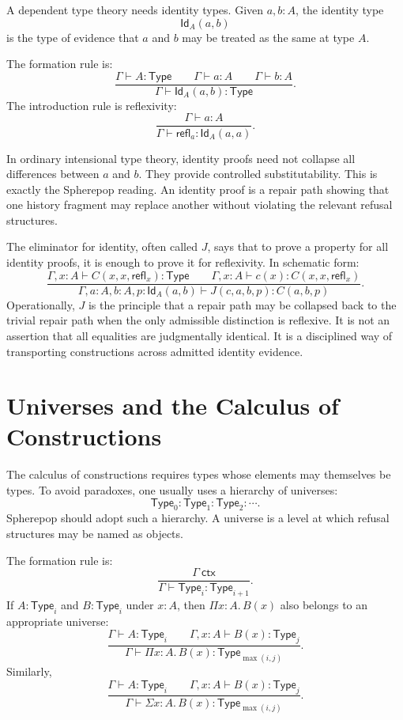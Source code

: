\documentclass[12pt,oneside]{article}
\newcommand{\Type}{\mathsf{Type}}
\newcommand{\Id}{\mathsf{Id}}
\newcommand{\judges}{\vdash}
\begin{document}
A dependent type theory needs identity types. Given $a,b:A$, the identity type
\[
\Id_A(a,b)
\]
is the type of evidence that $a$ and $b$ may be treated as the same at type $A$.

The formation rule is:
\[
\frac{\Gamma \judges A:\Type \qquad \Gamma \judges a:A \qquad \Gamma \judges b:A}
{\Gamma \judges \Id_A(a,b):\Type}.
\]
The introduction rule is reflexivity:
\[
\frac{\Gamma \judges a:A}
{\Gamma \judges \mathsf{refl}_a:\Id_A(a,a)}.
\]

In ordinary intensional type theory, identity proofs need not collapse all differences between $a$ and $b$. They provide controlled substitutability. This is exactly the Spherepop reading. An identity proof is a repair path showing that one history fragment may replace another without violating the relevant refusal structures.

The eliminator for identity, often called $J$, says that to prove a property for all identity proofs, it is enough to prove it for reflexivity. In schematic form:
\[
\frac{
\Gamma,x:A \judges C(x,x,\mathsf{refl}_x):\Type
\qquad
\Gamma,x:A \judges c(x):C(x,x,\mathsf{refl}_x)
}{
\Gamma,a:A,b:A,p:\Id_A(a,b) \judges J(c,a,b,p):C(a,b,p)
}.
\]
Operationally, $J$ is the principle that a repair path may be collapsed back to the trivial repair path when the only admissible distinction is reflexive. It is not an assertion that all equalities are judgmentally identical. It is a disciplined way of transporting constructions across admitted identity evidence.

\section{Universes and the Calculus of Constructions}

The calculus of constructions requires types whose elements may themselves be types. To avoid paradoxes, one usually uses a hierarchy of universes:
\[
\Type_0 : \Type_1 : \Type_2 : \cdots.
\]
Spherepop should adopt such a hierarchy. A universe is a level at which refusal structures may be named as objects.

The formation rule is:
\[
\frac{\Gamma \ \mathsf{ctx}}
{\Gamma \judges \Type_i : \Type_{i+1}}.
\]
If $A:\Type_i$ and $B:\Type_i$ under $x:A$, then $\Pi x:A.\,B(x)$ also belongs to an appropriate universe:
\[
\frac{\Gamma \judges A:\Type_i \qquad \Gamma,x:A \judges B(x):\Type_j}
{\Gamma \judges \Pi x:A.\,B(x):\Type_{\max(i,j)}}.
\]
Similarly,
\[
\frac{\Gamma \judges A:\Type_i \qquad \Gamma,x:A \judges B(x):\Type_j}
{\Gamma \judges \Sigma x:A.\,B(x):\Type_{\max(i,j)}}.
\]
\end{document}
